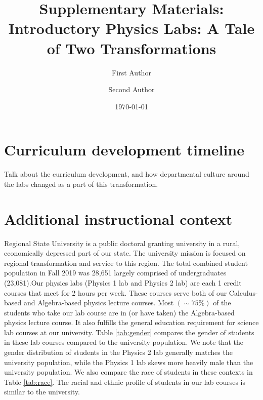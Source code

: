 \documentclass[aip, numerical, preprint]{revtex4-2}
\begin{document}
\title{Supplementary Materials: Introductory Physics Labs: A Tale of Two Transformations}


\author{First Author} 

\author{Second Author} 

\date{\today}


\maketitle

\section{Curriculum development timeline}
Talk about the curriculum development, and how departmental culture around the labs changed as
a part of this transformation.








\section{Additional instructional context}

Regional State University is a public doctoral granting university in a rural, economically
depressed part of our state.  The university mission is focused on regional transformation and
service to this region.  The total combined student population in Fall 2019 was 28,651 largely
comprised of undergraduates (23,081).Our physics labs (Physics 1 lab and Physics 2 lab) are
each 1 credit courses that meet for 2 hours per week. These courses serve both of our
Calculus-based and Algebra-based physics lecture courses.  Most $(\sim 75\%)$ of the students
who take our lab course are in (or have taken) the Algebra-based physics lecture course. It
also fulfills the general education requirement for science lab courses at our university.
Table \ref{tab:gender} compares the gender of students in these lab courses compared to the
university population.  We note that the gender distribution of students in the Physics 2 lab
generally matches the university population, while the Physics 1 lab skews more heavily male
than the university population.  We also compare the race of students in these contexts in
Table \ref{tab:race}.  The racial and ethnic profile of students in our lab courses is similar
to the university.
\end{document}
